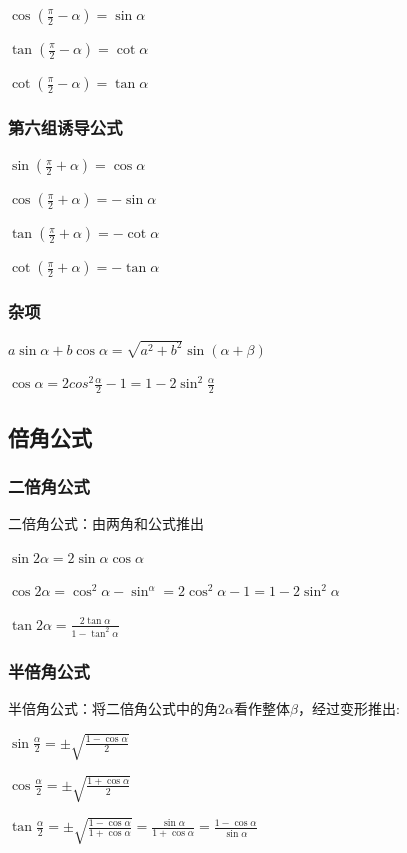 \documentclass[UTF8]{ctexbook}
\begin{document}
{{{{    $\cos(\frac{\pi}{2} - \alpha) = \sin\alpha$

    $\tan(\frac{\pi}{2} - \alpha) = \cot\alpha$

    $\cot(\frac{\pi}{2} - \alpha) = \tan\alpha$
  }

  \subsubsection{第六组诱导公式}{
    $\sin(\frac{\pi}{2} + \alpha) = \cos\alpha$

    $\cos(\frac{\pi}{2} + \alpha) = -\sin\alpha$

    $\tan(\frac{\pi}{2} + \alpha) = -\cot\alpha$

    $\cot(\frac{\pi}{2} + \alpha) = -\tan\alpha$
  }

  \subsubsection{杂项}{
    $a\sin\alpha + b\cos\alpha = \sqrt{a^2 + b^2}\sin(\alpha+\beta)$

    $\cos\alpha = 2cos^2\frac{\alpha}{2} - 1 = 1-2\sin^2\frac{\alpha}{2}$
  }

}

\subsection{倍角公式}{

\subsubsection{二倍角公式}{
  二倍角公式：由两角和公式推出

  $\sin2\alpha = 2\sin\alpha\cos\alpha$

  $\cos2\alpha = \cos^2\alpha - \sin^\alpha = 2\cos^2\alpha - 1 = 1 - 2\sin^2\alpha$

  $\tan2\alpha = \frac{2\tan\alpha}{1 - \tan^2\alpha}$
}

\subsubsection{半倍角公式}{
  半倍角公式：将二倍角公式中的角$2\alpha$看作整体$\beta$，经过变形推出:

  $\sin\frac{\alpha}{2} = \pm\sqrt{\frac{1 - \cos\alpha}{2}}$

  $\cos\frac{\alpha}{2} = \pm\sqrt{\frac{1 + \cos\alpha}{2}}$

  $\tan\frac{\alpha}{2} = \pm\sqrt{\frac{1-\cos\alpha}{1+\cos\alpha}} = \frac{\sin\alpha}{1+\cos\alpha} = \frac{1-\cos\alpha}{\sin\alpha}$

}}}}
\end{document}
